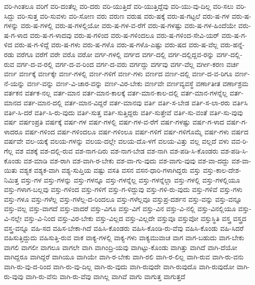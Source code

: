 {ವರಿ-ಗಿಂತಲೂ
ವರಿಗೆ
ವರಿ-ದಂತೆಲ್ಲ
ವರಿ-ದರು
ವರಿ-ಯುತ್ತಿದೆ
ವರಿ-ಯುತ್ತಿದ್ದೆವು
ವರಿ-ಯು-ವು-ದಿಲ್ಲ
ವರಿ-ಸಲು
ವರಿ-ಸಿದ್ದು
ವರಿ-ಸುತ್ತ
ವರಿ-ಸುವಳು
ವರಿ-ಸೋಣ
ವರು
ವರುಣ
ವರುಷ
ವರು-ಷಕ್ಕೆ
ವರು-ಷ-ಗಟ್ಟಲೆ
ವರು-ಷ-ಗಳ
ವರು-ಷ-ಗಳನ್ನು
ವರು-ಷ-ಗಳಲ್ಲಿ
ವರು-ಷ-ಗಳಲ್ಲಿಯೋ
ವರು-ಷ-ಗಳ-ವ-ರೆಗೆ
ವರು-ಷ-ಗಳಷ್ಟು
ವರು-ಷ-ಗಳ-ಹಿಂದೆಯೇ
ವರು-ಷ-ಗ-ಳಾದ
ವರು-ಷ-ಗ-ಳಾದವು
ವರು-ಷ-ಗಳಿಂದ
ವರು-ಷ-ಗಳಿಂದಲೂ
ವರು-ಷ-ಗಳಿಂದ-ಸೇವಿ-ಯರ್
ವರು-ಷ-ಗ-ಳಿದ
ವರು-ಷ-ಗ-ಳಿದ್ದೆ
ವರು-ಷ-ಗಳು
ವರು-ಷ-ಗಳೊ
ವರು-ಷ-ಗಳೊ-ಎಷ್ಟು
ವರು-ಷದ
ವರು-ಷ-ವೆಲ್ಲ
ವರು-ಹನ್ನೆ-ರಡು
ವರೆಗೂ
ವರೆಗೆ
ವರೇ
ವರೊ
ವರೋ
ವರ್ಗ-ಗಳಲ್ಲಿ
ವರ್ಗದ
ವರ್ಗ-ದಲ್ಲಿ
ವರ್ಗ-ದಲ್ಲಿದ್ದವ-ರನ್ನು
ವರ್ಗ-ದಲ್ಲಿ-ರುವ
ವರ್ಗ-ದ-ವ-ರಲ್ಲಿ
ವರ್ಗ-ದ-ವ-ರಿಂದ
ವರ್ಗ-ದ-ವರು
ವರ್ಗದ್ದು
ವರ್ಗವು
ವರ್ಗ-ವೆಲ್ಲ
ವರ್ಗೀ-ಕರಣ
ವರ್ಚ
ವರ್ಣ
ವರ್ಣಕ್ಕೆ
ವರ್ಣಕ್ಕೇ
ವರ್ಣ-ಗಳಲ್ಲಿ
ವರ್ಣ-ಗಳಿಗೆ
ವರ್ಣ-ಗಳು
ವರ್ಣದ
ವರ್ಣ-ದಲ್ಲಿ
ವರ್ಣ-ದ-ವ-ರಿಗೂ
ವರ್ಣ-ನೆ-ಯನ್ನು
ವರ್ಣ-ವನ್ನು
ವರ್ಣ-ವಿ-ಚಾರ-ವನ್ನು
ವರ್ಣ-ವಿರ-ಬೇಕು
ವರ್ಣವೇ
ವರ್ಣವ್ಯವಸ್ಥೆ
ವರ್ಣಾತೀತ
ವರ್ಣಾಶ್ರಮ
ವರ್ತಕನ
ವರ್ತಕ-ನಲ್ಲ
ವರ್ತ-ಮಾನ
ವರ್ತ-ಮಾನ-ಕಾಲಕ್ಕೆ
ವರ್ತ-ಮಾನ-ಕಾಲ-ದಲ್ಲಿ
ವರ್ತ-ಮಾನ-ಗಳನ್ನೆಲ್ಲ
ವರ್ತ-ಮಾನದ
ವರ್ತ-ಮಾನ-ದಲ್ಲಿ
ವರ್ತ-ಮಾನ-ವಿದ್ದರೆ
ವರ್ತ-ಮಾನವು
ವರ್ತಿ
ವರ್ತಿ-ಸ-ಬೇಡ
ವರ್ತಿ-ಸ-ಲಾ-ರರು
ವರ್ತಿಸಿ
ವರ್ತಿ-ಸಿ-ದರೆ
ವರ್ತಿ-ಸಿ-ರು-ವುದು
ವರ್ತಿ-ಸುತ್ತ
ವರ್ತಿ-ಸುತ್ತಿದ್ದರು
ವರ್ತಿ-ಸುತ್ತೇವೆ
ವರ್ತಿ-ಸು-ವಂತೆ
ವರ್ತಿ-ಸು-ವುವು
ವರ್ಷ
ವರ್ಷಂಪ್ರತಿ
ವರ್ಷಕ್ಕೆ
ವರ್ಷ-ಗಳ
ವರ್ಷ-ಗಳಲ್ಲಿ
ವರ್ಷ-ಗಳ-ವ-ರೆಗೆ
ವರ್ಷ-ಗಳಷ್ಟು
ವರ್ಷ-ಗ-ಳಾದ
ವರ್ಷ-ಗ-ಳಾದರೂ
ವರ್ಷ-ಗಳಿಂದ
ವರ್ಷ-ಗಳಿಂದಲೂ
ವರ್ಷ-ಗಳಿಂಲೂ
ವರ್ಷ-ಗಳಿಗೆ
ವರ್ಷ-ಗಳಿಗೊಮ್ಮೆ
ವರ್ಷ-ಗಳು
ವರ್ಷದ
ವರ್ಷವೇ
ವಲ-ಯಕ್ಕೆ
ವಲಯ-ಗಳನ್ನು
ವಲಯ-ದಲ್ಲೇ
ವಲಯ-ದೊ-ಳಗೆ
ವಲಯ-ವಿತ್ತು
ವಲ್ಲ
ವಲ್ಲದೆ
ವಳು
ವವ-ರಿ-ಗೆಲ್ಲ
ವಶ
ವಶಕ್ಕೆ
ವಶ-ದಲ್ಲಿ-ರುವ
ವಶ-ನಾಗ-ದಿರು
ವಶ-ನಾಗ-ಬೇಡ
ವಶ-ನಾಗಿ
ವಶ-ಪಡಿ-ಸಿ-ಕೊಂಡರು
ವಶ-ಪಡಿ-ಸಿ-ಕೊಂಡು
ವಶ-ಮಾಡಿ
ವಶ-ರಾಗಿ
ವಶ-ವಾಗಿ-ರ-ಬೇಕು
ವಶ-ವಾ-ಗು-ವುದು
ವಶ-ವಾಗು-ವುವು
ವಶ-ವಾ-ದದ್ದು
ವಶ-ವಾ-ಯಿತು
ವಶ್ಯಕ
ವಶ್ಯಕ-ವಾಗಿ
ವಶ್ಯ-ಸುಪ್ತಿಯ
ವಷ್ಟು
ವಸತಿ
ವಸನ
ವಸನ-ಧಾರಿ-ಗಳಾಗಿದ್ದರು
ವಸ್ತು
ವಸ್ತು-ಕಾಲ-ದೇಶ-ನಿಮಿತ್ತ
ವಸ್ತು-ಗಳ
ವಸ್ತು-ಗಳನ್ನು
ವಸ್ತು-ಗಳನ್ನೂ
ವಸ್ತು-ಗಳನ್ನೆಲ್ಲ
ವಸ್ತು-ಗಳನ್ನೆಲ್ಲಾ
ವಸ್ತು-ಗಳಲ್ಲಿ
ವಸ್ತು-ಗಳಲ್ಲಿಯೂ
ವಸ್ತು-ಗಳಾಗ-ಬಲ್ಲವು
ವಸ್ತು-ಗಳಿಂದ
ವಸ್ತು-ಗಳಿಗೆ
ವಸ್ತು-ಗ-ಳಿದ್ದುವು
ವಸ್ತು-ಗಳಿ-ರು-ವುದು
ವಸ್ತು-ಗಳಿವೆ
ವಸ್ತು-ಗಳು
ವಸ್ತು-ಗಳೂ
ವಸ್ತು-ಗಳೆಲ್ಲ
ವಸ್ತು-ಗಳೆಲ್ಲ-ದ-ರಿಂದಲೂ
ವಸ್ತು-ಗಳೆಲ್ಲವೂ
ವಸ್ತುಪ್ರ-ದರ್ಶನ
ವಸ್ತು-ವನ್ನು
ವಸ್ತು-ವನ್ನೂ
ವಸ್ತು-ವಲ್ಲ
ವಸ್ತು-ವಾಗದೆ
ವಸ್ತು-ವಾದರೆ
ವಸ್ತು-ವಿಗೂ
ವಸ್ತು-ವಿಗೆ
ವಸ್ತು-ವಿನ
ವಸ್ತು-ವಿ-ನಲ್ಲಿ
ವಸ್ತು-ವಿನಲ್ಲಿಯೂ
ವಸ್ತು-ವಿ-ನಲ್ಲೇ
ವಸ್ತು-ವಿ-ನಿಂದ
ವಸ್ತು-ವಿರ-ಬೇಕು
ವಸ್ತು-ವಿಲ್ಲದ
ವಸ್ತು-ವಿಲ್ಲದೇ
ವಸ್ತುವೂ
ವಸ್ತುವೋ
ವಸ್ತುಸ್ಥಿತಿ
ವಸ್ತ್ರ
ವಸ್ತ್ರದ
ವಸ್ತ್ರ-ವನ್ನೂ
ವಹಿ-ಸದ
ವಹಿಸ-ಬೇಕಾ-ಗಿದೆ
ವಹಿಸಿ-ಕೊಂಡರು
ವಹಿಸಿ-ಕೊಂಡಿ-ರು-ವೆವು
ವಹಿಸಿ-ಕೊಂಡು
ವಹಿ-ಸಿದರೆ
ವಹಿಸುತ್ತಿದ್ದುದು
ವಹಿಸುತ್ತಿ-ರುವ
ವಾಕ
ವಾಕ್ಯ-ಗಳಲ್ಲಿ
ವಾಕ್ಯ-ಗಳು
ವಾಕ್ಯಮುವಾಚ
ವಾಗ
ವಾಗ-ಬಹುದು
ವಾಗ-ಬೇಕು
ವಾಗಲಿ
ವಾಗಲೀ
ವಾಗಲೂ
ವಾಗಲೇ
ವಾಗಿ
ವಾಗಿಂದ್ರಿ-ಯವು
ವಾಗಿಟ್ಟು-ಕೊಂಡು
ವಾಗಿತ್ತು
ವಾಗಿದೆ
ವಾಗಿ-ದೆಯೋ
ವಾಗಿದ್ದರೂ
ವಾಗಿದ್ದರೆ
ವಾಗಿಯೂ
ವಾಗಿಯೇ
ವಾಗಿ-ರ-ಬೇಕು
ವಾಗಿ-ರಲಿ
ವಾಗಿ-ರ-ಲಿಲ್ಲ
ವಾಗಿ-ರುವ
ವಾಗಿ-ರು-ವನು
ವಾಗಿ-ರು-ವು-ದ-ರಿಂದ
ವಾಗಿ-ರು-ವು-ದಿಲ್ಲ
ವಾಗಿ-ರು-ವುದು
ವಾಗಿ-ರುವುದೇ
ವಾಗಿ-ರುವುದೊ
ವಾಗಿ-ರುವುದೋ
ವಾಗಿ-ರು-ವುವು
ವಾಗಿ-ರು-ವೆನು
ವಾಗಿ-ರು-ವೆವು
ವಾಗಿಲ್ಲ
ವಾಗಿವೆ
ವಾಗು
ವಾಗುತ್ತ
ವಾಗುತ್ತದೆ
}
